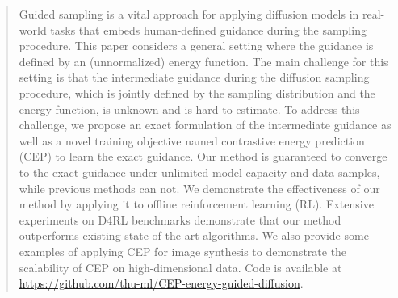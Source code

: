 \documentclass{article}
\theoremstyle{plain}
\theoremstyle{definition}
\theoremstyle{remark}
\begin{document}



\printAffiliationsAndNotice{\icmlEqualContribution} %

\begin{abstract}
Guided sampling is a vital approach for applying diffusion models in real-world tasks that embeds human-defined guidance during the sampling procedure. This paper considers a general setting where the guidance is defined by an (unnormalized) energy function. The main challenge for this setting is that the intermediate guidance during the diffusion sampling procedure, which is jointly defined by the sampling distribution and the energy function, is unknown and is hard to estimate. To address this challenge, we propose an exact formulation of the intermediate guidance as well as a novel training objective named contrastive energy prediction (CEP) to learn the exact guidance. Our method is guaranteed to converge to the exact guidance under unlimited model capacity and data samples, while previous methods can not. We demonstrate the effectiveness of our method by applying it to offline reinforcement learning (RL). Extensive experiments on D4RL benchmarks demonstrate that our method outperforms existing state-of-the-art algorithms. We also provide some examples of applying CEP for image synthesis to demonstrate the scalability of CEP on high-dimensional data. Code is available at \url{https://github.com/thu-ml/CEP-energy-guided-diffusion}.







\end{abstract}
\end{document}
